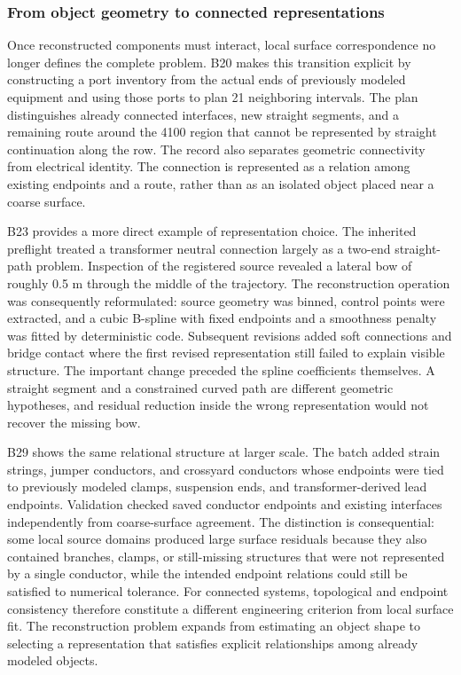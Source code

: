 \documentclass[10pt,a4paper]{article}
\begin{document}
\hypertarget{from-object-geometry-to-connected-representations}{%
\subsubsection{From object geometry to connected
representations}\label{from-object-geometry-to-connected-representations}}

Once reconstructed components must interact, local surface
correspondence no longer defines the complete problem. B20 makes this
transition explicit by constructing a port inventory from the actual
ends of previously modeled equipment and using those ports to plan 21
neighboring intervals. The plan distinguishes already connected
interfaces, new straight segments, and a remaining route around the 4100
region that cannot be represented by straight continuation along the
row. The record also separates geometric connectivity from electrical
identity. The connection is represented as a relation among existing
endpoints and a route, rather than as an isolated object placed near a
coarse surface.

B23 provides a more direct example of representation choice. The
inherited preflight treated a transformer neutral connection largely as
a two-end straight-path problem. Inspection of the registered source
revealed a lateral bow of roughly 0.5 m through the middle of the
trajectory. The reconstruction operation was consequently reformulated:
source geometry was binned, control points were extracted, and a cubic
B-spline with fixed endpoints and a smoothness penalty was fitted by
deterministic code. Subsequent revisions added soft connections and
bridge contact where the first revised representation still failed to
explain visible structure. The important change preceded the spline
coefficients themselves. A straight segment and a constrained curved
path are different geometric hypotheses, and residual reduction inside
the wrong representation would not recover the missing bow.

B29 shows the same relational structure at larger scale. The batch added
strain strings, jumper conductors, and crossyard conductors whose
endpoints were tied to previously modeled clamps, suspension ends, and
transformer-derived lead endpoints. Validation checked saved conductor
endpoints and existing interfaces independently from coarse-surface
agreement. The distinction is consequential: some local source domains
produced large surface residuals because they also contained branches,
clamps, or still-missing structures that were not represented by a
single conductor, while the intended endpoint relations could still be
satisfied to numerical tolerance. For connected systems, topological and
endpoint consistency therefore constitute a different engineering
criterion from local surface fit. The reconstruction problem expands
from estimating an object shape to selecting a representation that
satisfies explicit relationships among already modeled objects.
\end{document}
